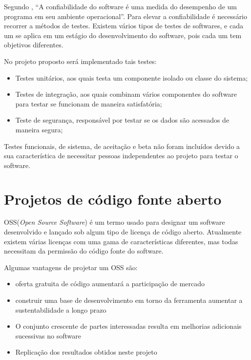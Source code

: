 Segundo \cite{mathur1991performance}, “A confiabilidade do software é uma medida do desempenho de um programa em seu ambiente operacional”. Para elevar a confiabilidade é necessário recorrer a métodos de testes. Existem vários tipos de testes de softwares, e cada um se aplica em um estágio do desenvolvimento do software, pois cada um tem objetivos diferentes\cite{nidhra2012black}. \par
No projeto proposto será implementado tais testes: \par
\begin{itemize}  
\item Testes unitários, aos quais testa um componente isolado ou classe do sistema;
\item Testes de integração, aos quais combinam vários componentes do software para testar se funcionam de maneira satisfatória;
\item Teste de segurança, responsável por testar se os dados são acessados de maneira segura;
\end{itemize}
Testes funcionais, de sistema, de aceitação e beta não foram incluídos devido a sua característica de necessitar pessoas independentes ao projeto para testar o software.

\section{Projetos de código fonte aberto}
OSS(\textit{Open Source Software}) é um termo usado para designar um software desenvolvido e lançado sob algum tipo de licença de código aberto. Atualmente existem várias licenças com uma gama de características diferentes, mas todas necessitam da permissão do código fonte do software\cite{crowston2003defining}.

Algumas vantagens de projetar um OSS são:
\begin{itemize}  
\item oferta gratuita de código aumentará a participação de mercado\cite{fitzgerald2006transformation}
\item construir uma base de desenvolvimento em torno da ferramenta aumentar a sustentabilidade a longo prazo\cite{nyman2011forking}
\item O conjunto crescente de partes interessadas resulta em melhorias adicionais sucessivas no software\cite{heron2013open}
\item Replicação dos resultados obtidos neste projeto
\end{itemize}


